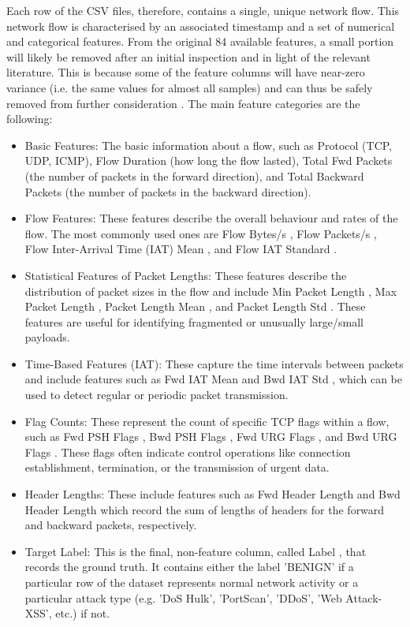 Each row of the CSV files, therefore, contains a single, unique network flow. This network flow is characterised by an associated timestamp and a set of numerical and categorical features. From the original 84 available features, a small portion will likely be removed after an initial inspection and in light of the relevant literature. This is because some of the feature columns will have near-zero variance (i.e. the same values for almost all samples) and can thus be safely removed from further consideration \parencite {kumar2021cicids}. The main feature categories are the following: 
\begin{itemize}[noitemsep] 
\item Basic Features: The basic information about a flow, such as Protocol (TCP, UDP, ICMP), Flow Duration (how long the flow lasted), Total Fwd Packets (the number of packets in the forward direction), and Total Backward Packets (the number of packets in the backward direction).
\item Flow Features: These features describe the overall behaviour and rates of the flow. The most commonly used ones are Flow Bytes/s , Flow Packets/s , Flow Inter-Arrival Time (IAT) Mean , and Flow IAT Standard .
\item Statistical Features of Packet Lengths: These features describe the distribution of packet sizes in the flow and include Min Packet Length , Max Packet Length , Packet Length Mean , and Packet Length Std . These features are useful for identifying fragmented or unusually large/small payloads.
\item Time-Based Features (IAT): These capture the time intervals between packets and include features such as Fwd IAT Mean and Bwd IAT Std , which can be used to detect regular or periodic packet transmission.
\item Flag Counts: These represent the count of specific TCP flags within a flow, such as Fwd PSH Flags , Bwd PSH Flags , Fwd URG Flags , and Bwd URG Flags . These flags often indicate control operations like connection establishment, termination, or the transmission of urgent data.
\item Header Lengths: These include features such as Fwd Header Length and Bwd Header Length which record the sum of lengths of headers for the forward and backward packets, respectively.
\item Target Label: This is the final, non-feature column, called Label , that records the ground truth. It contains either the label 'BENIGN' if a particular row of the dataset represents normal network activity or a particular attack type (e.g. 'DoS Hulk', 'PortScan', 'DDoS', 'Web Attack-XSS', etc.) if not. 
\end{itemize} 
